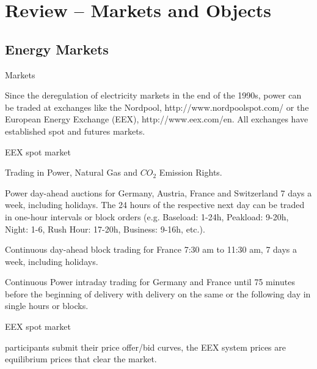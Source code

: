 \section{Review -- Markets and Objects}
\subsection{Energy Markets}

{Markets}

Since the deregulation of electricity markets in the end of the
1990s, power can be traded at exchanges like the Nordpool, http://www.nordpoolspot.com/  or the
European Energy Exchange (EEX), http://www.eex.com/en. All exchanges have established
spot and futures markets.


{EEX spot market}






	Trading in Power, Natural Gas and $CO_2$ Emission Rights.

	Power day-ahead auctions for Germany, Austria, France and Switzerland 7 days a week, including holidays. The 24 hours of the respective next day can be traded in one-hour intervals or block orders (e.g. Baseload: 1-24h, Peakload: 9-20h, Night: 1-6, Rush Hour: 17-20h, Business: 9-16h, etc.).

	Continuous day-ahead block trading for France 7:30 am to 11:30 am, 7 days a week, including holidays.

	Continuous Power intraday trading for Germany and France until 75 minutes before the beginning of delivery with delivery on the same or the following day in single hours or blocks.






{EEX spot market}






	participants submit their price offer/bid curves, the EEX system prices are equilibrium prices that clear the market.

